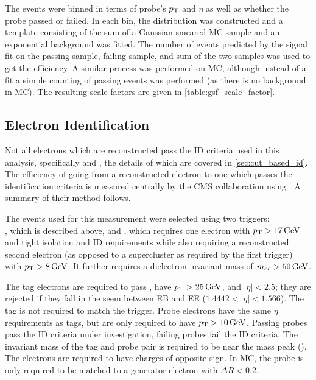 The events were binned in terms of probe's $p_{\mathrm{T}}$ and $\eta$ as well as whether
the probe passed or failed. In each bin, the \mee distribution was constructed
and a template consisting of the sum of a Gaussian smeared \Ztoee MC sample and
an exponential background was fitted. The number of events predicted by the
signal fit on the passing sample, failing sample, and sum of the two samples
was used to get the efficiency. A similar process was performed on MC, although
instead of a fit a simple counting of passing events was performed (as there is
no background in MC). The resulting scale factors are given in
\cref{table:gsf_scale_factor}.



\subsection{Electron Identification}
\label{ssec:sf_id}

Not all electrons which are reconstructed pass the ID criteria used in this
analysis, specifically \EGMEDIUM and \EGTIGHT, the details of which are covered
in \cref{sec:cut_based_id}. The efficiency of going from a
reconstructed electron to one which passes the identification criteria is
measured centrally by the CMS collaboration using \TnP \cite{cms_an_2014-055}.
A summary of their method follows.

The events used for this measurement were selected using two triggers: \\
\TnPTrigger, which is described above, and \TnPTriggerSecond, which requires
one electron with $\pt > \SI{17}{\GeV}$ and tight isolation and ID requirements
while also requiring a reconstructed second electron (as opposed to a
supercluster as required by the first trigger) with $\pt > \SI{8}{\GeV}$. It
further requires a dielectron invariant mass of $\mee > \SI{50}{\GeV}$.

The tag electrons are required to pass \EGTIGHT, have $\pt > \SI{25}{\GeV}$,
and $|\eta| < 2.5$; they are rejected if they fall in the seem between EB and
EE ($1.4442 < |\eta| < 1.566$). The tag is not required to match the trigger.
Probe electrons have the same $\eta$ requirements as tags, but are only
required to have $\pt > \SI{10}{\GeV}$. Passing probes pass the ID criteria
under investigation, failing probes fail the ID criteria. The invariant mass of
the tag and probe pair is required to be near the \Z mass peak (\MassRange).
The electrons are required to have charges of opposite sign. In MC, the probe
is only required to be matched to a generator electron with $\Delta R < 0.2$.

